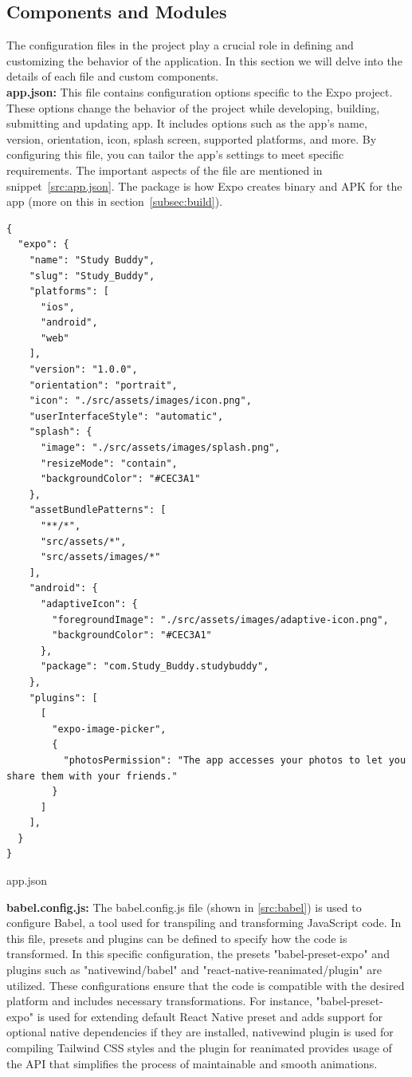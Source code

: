 \subsection{Components and Modules}
The configuration files in the project play a crucial role in defining and customizing the behavior of the application. In this section we will delve into the details of each file and custom components.\\
    \textbf{app.json:} This file contains configuration options specific to the Expo project. These options change the behavior of the project while developing, building, submitting and updating app. It includes options such as the app's name, version, orientation, icon, splash screen, supported platforms, and more. By configuring this file, you can tailor the app's settings to meet specific requirements. The important aspects of the file are mentioned in snippet~\ref{src:app.json}. The package is how Expo creates binary and APK for the app (more on this in section~\ref{subsec:build}).
\begin{listing}[H]
\begin{verbatim} 
{
  "expo": {
    "name": "Study Buddy",
    "slug": "Study_Buddy",
    "platforms": [
      "ios",
      "android",
      "web"
    ],
    "version": "1.0.0",
    "orientation": "portrait",
    "icon": "./src/assets/images/icon.png",
    "userInterfaceStyle": "automatic",
    "splash": {
      "image": "./src/assets/images/splash.png",
      "resizeMode": "contain",
      "backgroundColor": "#CEC3A1"
    },
    "assetBundlePatterns": [
      "**/*",
      "src/assets/*",
      "src/assets/images/*"
    ],
    "android": {
      "adaptiveIcon": {
        "foregroundImage": "./src/assets/images/adaptive-icon.png",
        "backgroundColor": "#CEC3A1"
      },
      "package": "com.Study_Buddy.studybuddy",
    },
    "plugins": [
      [
        "expo-image-picker",
        {
          "photosPermission": "The app accesses your photos to let you share them with your friends."
        }
      ]
    ],
  }
}
\end{verbatim}
\caption{app.json}
\label{src:app.json}
\end{listing}
    \textbf{babel.config.js:} The babel.config.js file (shown in \ref{src:babel}) is used to configure Babel, a tool used for transpiling and transforming JavaScript code. In this file, presets and plugins can be defined to specify how the code is transformed. In this specific configuration, the presets "babel-preset-expo" and plugins such as "nativewind/babel" and "react-native-reanimated/plugin" are utilized. These configurations ensure that the code is compatible with the desired platform and includes necessary transformations. For instance, "babel-preset-expo" is used for extending default React Native preset and adds support for optional native dependencies if they are installed, nativewind plugin is used for compiling Tailwind CSS styles and the plugin for reanimated provides usage of the API that simplifies the process of maintainable and smooth animations. 
